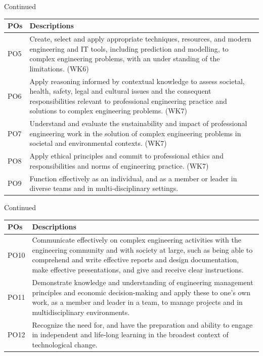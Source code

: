 \documentclass[aspectratio=169,11pt]{beamer}
\begin{document}
\begin{frame}{Continued}
\small
\renewcommand{\arraystretch}{1.35}
\begin{tabularx}{\textwidth}{@{}p{10mm}Y@{}}
\toprule
\textbf{POs} & \textbf{Descriptions} \\
\midrule

PO5 & Create, select and apply appropriate techniques, resources, and modern engineering and IT tools, including prediction and modelling, to complex engineering problems, with an under standing of the limitations. (WK6)\\
PO6 & Apply reasoning informed by contextual knowledge to assess societal, health, safety, legal and cultural issues and the consequent responsibilities relevant to professional engineering practice and solutions to complex engineering problems. (WK7)\\

PO7 & Understand and evaluate the sustainability and impact of professional engineering work in the solution of complex engineering problems in societal and environmental contexts. (WK7) \\

PO8 & Apply ethical principles and commit to professional ethics and responsibilities and norms of engineering practice. (WK7) \\

PO9 & Function effectively as an individual, and as a member or leader in diverse teams and in multi-disciplinary settings. \\


\bottomrule
\end{tabularx}
\end{frame}

\begin{frame}{Continued}
\small
\renewcommand{\arraystretch}{1.35}
\begin{tabularx}{\textwidth}{@{}p{10mm}Y@{}}
\toprule
\textbf{POs} & \textbf{Descriptions} \\
\midrule

PO10 & Communicate effectively on complex engineering activities with the engineering community and with society at large, such as being able to comprehend and write effective reports and design documentation, make effective presentations, and give and receive clear instructions. \\

PO11 & Demonstrate knowledge and understanding of engineering management principles and economic decision-making and apply these to one's own work, as a member and leader in a team, to manage projects and in multidisciplinary environments. \\

PO12 & Recognize the need for, and have the preparation and ability to engage in independent and life-long learning in the broadest context of technological change. \\
\bottomrule
\end{tabularx}
\end{frame}
\end{document}
